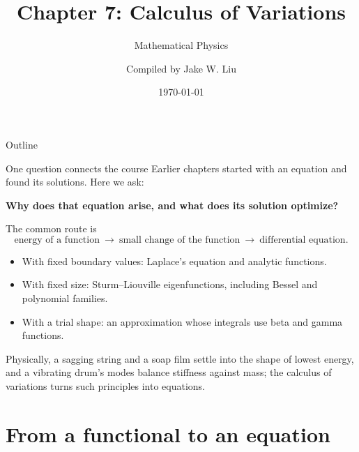 \documentclass[11pt]{beamer}
\author[]{Compiled by Jake W. Liu}
\title[Calculus of Variations]{Chapter 7: Calculus of Variations}
\subtitle{Mathematical Physics}
\date{\today}
\begin{document}
\setcounter{sfchapter}{7}
\renewcommand{\thesection}{\arabic{sfchapter}.\arabic{section}}

\begin{frame}[c]\titlepage\end{frame}

\begin{frame}{Outline}
\tableofcontents
\end{frame}

\begin{frame}{One question connects the course}
\small
Earlier chapters started with an equation and found its solutions. Here we ask:
\begin{center}
\textbf{Why does that equation arise, and what does its solution optimize?}
\end{center}
The common route is
\[
 \text{energy of a function}\ \longrightarrow\ \text{small change of the function}
 \ \longrightarrow\ \text{differential equation}.
\]
\begin{itemize}
\item With fixed boundary values: Laplace's equation and analytic functions.
\item With fixed size: Sturm--Liouville eigenfunctions, including Bessel and polynomial families.
\item With a trial shape: an approximation whose integrals use beta and gamma functions.
\end{itemize}
Physically, a sagging string and a soap film settle into the shape of lowest energy, and a
vibrating drum's modes balance stiffness against mass; the calculus of variations turns such
principles into equations.
\end{frame}

\section{From a functional to an equation}
\end{document}
